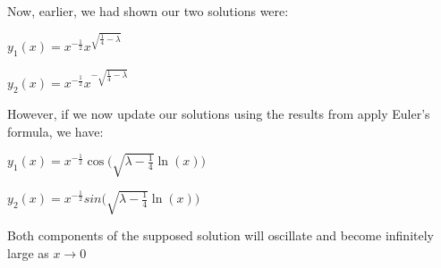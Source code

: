 \documentclass[executivepaper]{article}
\begin{document}
\begin{flushleft}
Now, earlier, we had shown our two solutions were:

\begin{center}

$y_{1}(x)=x^{-\frac{1}{2}}x^{\sqrt{\frac{1}{4}-\lambda}}$

\hspace{1mm}

$y_{2}(x)=x^{-\frac{1}{2}}x^{-\sqrt{\frac{1}{4}-\lambda}}$

\end{center}

However, if we now update our solutions using the results from apply Euler's formula, we have:

\begin{center}

$y_{1}(x)=x^{-\frac{1}{2}}\cos\bigg(\sqrt{\lambda-\frac{1}{4}} \ln(x)\bigg)$

\hspace{1mm}

$y_{2}(x)=x^{-\frac{1}{2}}sin\bigg(\sqrt{\lambda-\frac{1}{4}} \ln(x)\bigg)$

\end{center}

Both components of the supposed solution will oscillate and become infinitely large as $x \rightarrow 0$

\end{flushleft}
\end{document}
